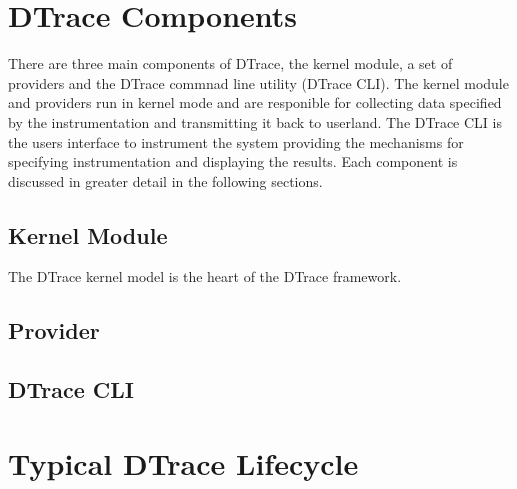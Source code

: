 \section{DTrace Components}

There are three main components of DTrace, the kernel module, a set of providers and the DTrace commnad line utility (DTrace CLI). The kernel module and providers run in kernel mode and are responible for collecting data specified by the instrumentation and transmitting it back to userland. The DTrace CLI is the users interface to instrument the system providing the mechanisms for specifying instrumentation and displaying the results. Each component is discussed in greater detail in the following sections.

\subsection{Kernel Module}

The DTrace kernel model is the heart of the DTrace framework. 


\subsection{Provider}


\subsection{DTrace CLI}


\section{Typical DTrace Lifecycle}

